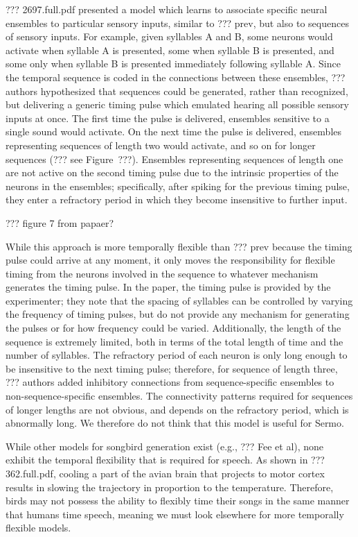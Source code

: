 ??? 2697.full.pdf presented a model
which learns to associate specific neural ensembles
to particular sensory inputs,
similar to ??? prev,
but also to sequences of sensory inputs.
For example, given syllables A and B,
some neurons would activate
when syllable A is presented,
some when syllable B is presented,
and some only when syllable B is presented
immediately following syllable A.
Since the temporal sequence is
coded in the connections between
these ensembles,
??? authors hypothesized that
sequences could be generated,
rather than recognized,
but delivering a generic timing pulse
which emulated hearing all possible sensory
inputs at once.
The first time the pulse is delivered,
ensembles sensitive to a single sound
would activate.
On the next time the pulse is delivered,
ensembles representing sequences of length two
would activate, and so on for longer sequences
(??? see Figure~???).
Ensembles representing sequences of length one
are not active on the second timing pulse
due to the intrinsic properties
of the neurons in the ensembles;
specifically, after spiking
for the previous timing pulse,
they enter a refractory period
in which they become insensitive to further input.

??? figure 7 from papaer?

While this approach is more temporally flexible
than ??? prev because
the timing pulse could arrive at any moment,
it only moves the responsibility for flexible timing
from the neurons involved in the sequence
to whatever mechanism generates the timing pulse.
In the paper, the timing pulse is provided
by the experimenter;
they note that the spacing of syllables
can be controlled by varying the frequency
of timing pulses,
but do not provide any mechanism
for generating the pulses
or for how frequency could be varied.
Additionally, the length of the sequence
is extremely limited,
both in terms of the total length of time
and the number of syllables.
The refractory period of each neuron
is only long enough to be insensitive
to the next timing pulse;
therefore, for sequence of length three,
??? authors added inhibitory connections
from sequence-specific ensembles
to non-sequence-specific ensembles.
The connectivity patterns required
for sequences of longer lengths
are not obvious,
and depends on the refractory period,
which is abnormally long.
We therefore do not think that
this model is useful for Sermo.

While other models for songbird generation exist
(e.g., ??? Fee et al),
none exhibit the temporal flexibility
that is required for speech.
As shown in ??? 362.full.pdf,
cooling a part of the avian brain
that projects to motor cortex
results in slowing the trajectory
in proportion to the temperature.
Therefore, birds may not possess
the ability to flexibly time their songs
in the same manner that humans time speech,
meaning we must look elsewhere for
more temporally flexible models.

